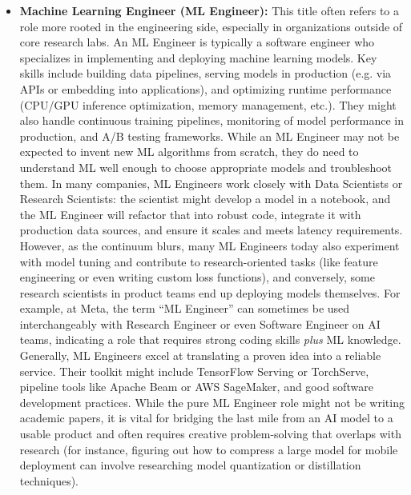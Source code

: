 \documentclass[pdflatex,sn-mathphys-num]{sn-jnl}%
\theoremstyle{thmstyleone}%
\theoremstyle{thmstyletwo}%
\theoremstyle{thmstylethree}%
\begin{document}
\begin{itemize}
\item \textbf{Machine Learning Engineer (ML Engineer):} This title often refers to a role more rooted in the engineering side, especially in organizations outside of core research labs. An ML Engineer is typically a software engineer who specializes in implementing and deploying machine learning models. Key skills include building data pipelines, serving models in production (e.g. via APIs or embedding into applications), and optimizing runtime performance (CPU/GPU inference optimization, memory management, etc.). They might also handle continuous training pipelines, monitoring of model performance in production, and A/B testing frameworks. While an ML Engineer may not be expected to invent new ML algorithms from scratch, they do need to understand ML well enough to choose appropriate models and troubleshoot them. In many companies, ML Engineers work closely with Data Scientists or Research Scientists: the scientist might develop a model in a notebook, and the ML Engineer will refactor that into robust code, integrate it with production data sources, and ensure it scales and meets latency requirements. However, as the continuum blurs, many ML Engineers today also experiment with model tuning and contribute to research-oriented tasks (like feature engineering or even writing custom loss functions), and conversely, some research scientists in product teams end up deploying models themselves. For example, at Meta, the term “ML Engineer” can sometimes be used interchangeably with Research Engineer or even Software Engineer on AI teams, indicating a role that requires strong coding skills \emph{plus} ML knowledge. Generally, ML Engineers excel at translating a proven idea into a reliable service. Their toolkit might include TensorFlow Serving or TorchServe, pipeline tools like Apache Beam or AWS SageMaker, and good software development practices. While the pure ML Engineer role might not be writing academic papers, it is vital for bridging the last mile from an AI model to a usable product and often requires creative problem-solving that overlaps with research (for instance, figuring out how to compress a large model for mobile deployment can involve researching model quantization\citep{dettmers2022llmint8,frantar2022gptq,dettmers2023qlora} or distillation\citep{hinton2015distill} techniques). 
\end{itemize}
\end{document}
